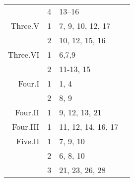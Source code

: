 \documentclass[11pt]{article}
\begin{document}
\begin{center}
\begin{tabular}{|r|c|ll|}
         &4  &13--16                &      \\
Three.V  &1  &7, 9, 10, 12, 17      &      \\
         &2  &10, 12, 15, 16        &      \\
Three.VI &1  &6,7,9                 &      \\
         &2  &11-13, 15             &      \\ \hline
Four.I   &1  &1, 4                  &      \\
         &2  &8, 9                  &      \\
Four.II  &1  &9, 12, 13, 21         &      \\
Four.III &1  &11, 12, 14, 16, 17    &      \\ \hline
Five.II  &1  &7, 9, 10              &      \\
         &2  &6, 8, 10              &      \\
         &3  &21, 23, 26, 28        &      \\ \hline
\end{tabular}
\end{center}
\end{document}
